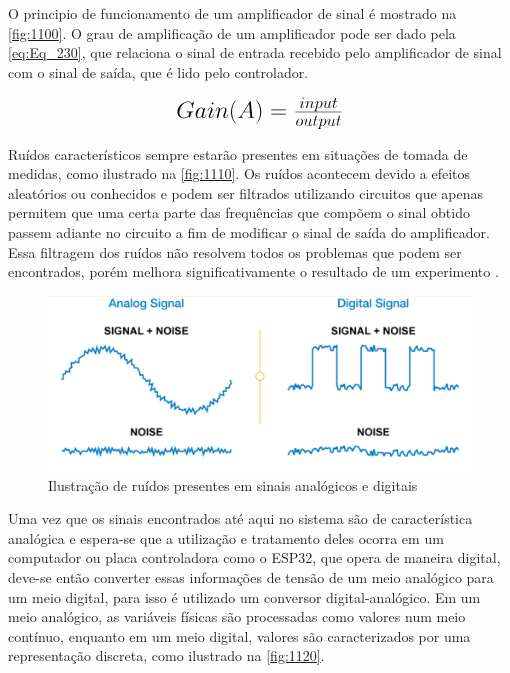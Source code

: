 O principio de funcionamento de um amplificador de sinal é mostrado na \autoref{fig:1100}.
O grau de amplificação de um amplificador pode ser dado pela \autoref{eq:Eq_230}, que relaciona o sinal de entrada recebido pelo amplificador de sinal com o sinal de saída, que é lido pelo controlador.

\begin{equation}\label{eq:Eq_230}%
\mbox{\fontsize{17.28}{21.6}\selectfont\( %
Gain(A) = \frac{input}{output}
\)} %
\end{equation}

%
%
%

\hfill

Ruídos característicos sempre estarão presentes em situações de tomada de medidas, como ilustrado na \autoref{fig:1110}.
Os ruídos acontecem devido a efeitos aleatórios ou conhecidos e podem ser filtrados utilizando circuitos que apenas permitem que uma certa parte das frequências que compõem o sinal obtido passem
adiante no circuito a fim de modificar o sinal de saída do amplificador.
Essa filtragem dos ruídos não resolvem todos os problemas que podem ser encontrados, porém melhora significativamente o resultado de um experimento \autocite{Hollman2011}.

\begin{figure}[htb]
	\caption{\label{fig:1110} Ilustração de ruídos presentes em sinais analógicos e digitais}
	\begin{center}
		\includegraphics[width=\textwidth]{pictures/1110.png}
	\end{center}
\end{figure}

Uma vez que os sinais encontrados até aqui no sistema são de característica analógica e espera-se que a utilização e tratamento deles ocorra em um computador ou placa
controladora como o ESP32, que opera de maneira digital, deve-se então converter essas informações de tensão de um meio analógico para um meio digital, para isso é utilizado
um conversor digital-analógico.
Em um meio analógico, as variáveis físicas são processadas como valores num meio contínuo, enquanto em um meio digital, valores são caracterizados por uma representação
discreta, como ilustrado na \autoref{fig:1120}.

